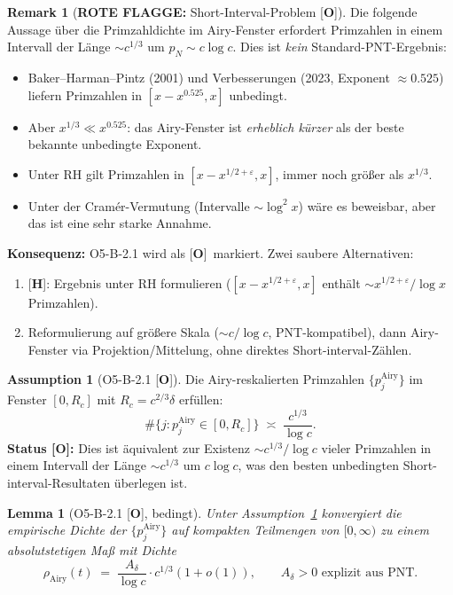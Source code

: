 \documentclass[12pt,a4paper]{amsart}
\newcommand{\statusO}{{\color{red}[\textbf{O}]}}
\newcommand{\statusH}{{\color{orange}[\textbf{H}]}}
\newcommand{\roteFlagge}[1]{{\color{red}\textbf{ROTE FLAGGE: }#1}}
\newtheorem{lemma}[theorem]{Lemma}
\theoremstyle{definition}
\newtheorem{assumption}[theorem]{Assumption}
\newtheorem{remark}[theorem]{Remark}
\begin{document}
\begin{remark}[\roteFlagge{Short-Interval-Problem} \statusO]
\label{rem:short_interval}
Die folgende Aussage über die Primzahldichte im Airy-Fenster erfordert
Primzahlen in einem Intervall der Länge $\sim c^{1/3}$ um $p_N \sim c\log c$.
Dies ist \emph{kein} Standard-PNT-Ergebnis:
\begin{itemize}
  \item Baker--Harman--Pintz (2001) und Verbesserungen (2023, Exponent $\approx 0.525$)
    liefern Primzahlen in $[x - x^{0.525}, x]$ unbedingt.
  \item Aber $x^{1/3} \ll x^{0.525}$: das Airy-Fenster ist
    \emph{erheblich kürzer} als der beste bekannte unbedingte Exponent.
  \item Unter RH gilt Primzahlen in $[x - x^{1/2+\varepsilon}, x]$,
    immer noch größer als $x^{1/3}$.
  \item Unter der Cramér-Vermutung (Intervalle $\sim \log^2 x$) wäre
    es beweisbar, aber das ist eine sehr starke Annahme.
\end{itemize}
\textbf{Konsequenz:} O5-B-2.1 wird als \statusO\ markiert.
Zwei saubere Alternativen:
\begin{enumerate}
  \item \statusH: Ergebnis unter RH formulieren
    ($[x-x^{1/2+\varepsilon}, x]$ enthält $\sim x^{1/2+\varepsilon}/\log x$ Primzahlen).
  \item Reformulierung auf größere Skala ($\sim c/\log c$, PNT-kompatibel),
    dann Airy-Fenster via Projektion/Mittelung, ohne direktes Short-interval-Zählen.
\end{enumerate}
\end{remark}

\begin{assumption}[O5-B-2.1 \statusO]
\label{ass:density}
Die Airy-reskalierten Primzahlen $\{p_j^{\mathrm{Airy}}\}$ im Fenster $[0,R_c]$
mit $R_c = c^{2/3}\delta$ erfüllen:
\[
  \#\{j : p_j^{\mathrm{Airy}} \in [0,R_c]\}
  \;\asymp\; \frac{c^{1/3}}{\log c}.
\]
\textbf{Status \statusO:}
Dies ist äquivalent zur Existenz $\sim c^{1/3}/\log c$ vieler Primzahlen
in einem Intervall der Länge $\sim c^{1/3}$ um $c\log c$,
was den besten unbedingten Short-interval-Resultaten überlegen ist.
\end{assumption}

\begin{lemma}[O5-B-2.1 \statusO, bedingt]
\label{lem:O5B21}
Unter Assumption~\ref{ass:density} konvergiert die empirische Dichte
der $\{p_j^{\mathrm{Airy}}\}$ auf kompakten Teilmengen von $[0,\infty)$
zu einem absolutstetigen Maß mit Dichte
\[
  \rho_{\mathrm{Airy}}(t) \;=\; \frac{A_\delta}{\log c}\cdot c^{1/3}(1+o(1)),
  \qquad A_\delta > 0 \text{ explizit aus PNT}.
\]
\end{lemma}
\end{document}
